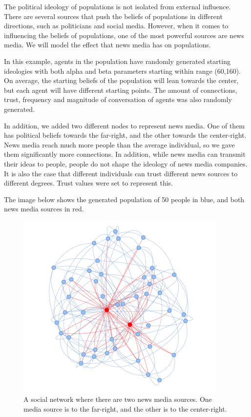 \documentclass[11pt]{article}
\begin{document}
The political ideology of populations is not isolated from external influence. There are several sources that push the beliefs of populations in different directions, such as politicians and social media. However, when it comes to influencing the beliefs of populations, one of the most powerful sources are news media. We will model the effect that news media has on populations.

In this example, agents in the population have randomly generated starting ideologies with both alpha and beta parameters starting within range (60,160). On average, the starting beliefs of the population will lean towards the center, but each agent will have different starting points. The amount of connections, trust, frequency and magnitude of conversation of agents was also randomly generated. 

In addition, we added two different nodes to represent news media. One of them has political beliefs towards the far-right, and the other towards the center-right.  News media reach much more people than the average individual, so we gave them significantly more connections. In addition, while news media can transmit their ideas to people, people do not shape the ideology of news media companies. It is also the case that different individuals can trust different news sources to different degrees. Trust values were set to represent this.

The image below shows the generated population of 50 people in blue, and both news media sources in red.

\begin{figure}[h]
    \centering
    \includegraphics[scale=0.7]{images/News media simulation.png}
    \caption{A social network where there are two news media sources. One media source is to the far-right, and the other is to the center-right.}
\end{figure}
\end{document}
